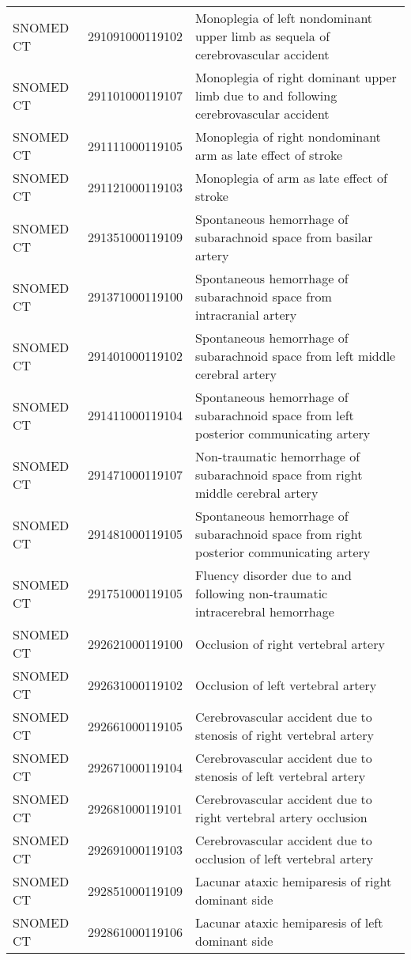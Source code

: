 \begin{longtable}{p{}p{}p{}}
  SNOMED CT & 291091000119102 & Monoplegia of left nondominant upper limb as sequela of cerebrovascular accident \\ 
  SNOMED CT & 291101000119107 & Monoplegia of right dominant upper limb due to and following cerebrovascular accident \\ 
  SNOMED CT & 291111000119105 & Monoplegia of right nondominant arm as late effect of stroke \\ 
  SNOMED CT & 291121000119103 & Monoplegia of arm as late effect of stroke \\ 
  SNOMED CT & 291351000119109 & Spontaneous hemorrhage of subarachnoid space from basilar artery \\ 
  SNOMED CT & 291371000119100 & Spontaneous hemorrhage of subarachnoid space from intracranial artery \\ 
  SNOMED CT & 291401000119102 & Spontaneous hemorrhage of subarachnoid space from left middle cerebral artery \\ 
  SNOMED CT & 291411000119104 & Spontaneous hemorrhage of subarachnoid space from left posterior communicating artery \\ 
  SNOMED CT & 291471000119107 & Non-traumatic hemorrhage of subarachnoid space from right middle cerebral artery \\ 
  SNOMED CT & 291481000119105 & Spontaneous hemorrhage of subarachnoid space from right posterior communicating artery \\ 
  SNOMED CT & 291751000119105 & Fluency disorder due to and following non-traumatic intracerebral hemorrhage \\ 
  SNOMED CT & 292621000119100 & Occlusion of right vertebral artery \\ 
  SNOMED CT & 292631000119102 & Occlusion of left vertebral artery \\ 
  SNOMED CT & 292661000119105 & Cerebrovascular accident due to stenosis of right vertebral artery \\ 
  SNOMED CT & 292671000119104 & Cerebrovascular accident due to stenosis of left vertebral artery \\ 
  SNOMED CT & 292681000119101 & Cerebrovascular accident due to right vertebral artery occlusion \\ 
  SNOMED CT & 292691000119103 & Cerebrovascular accident due to occlusion of left vertebral artery \\ 
  SNOMED CT & 292851000119109 & Lacunar ataxic hemiparesis of right dominant side \\ 
  SNOMED CT & 292861000119106 & Lacunar ataxic hemiparesis of left dominant side \\ 

\end{longtable}
